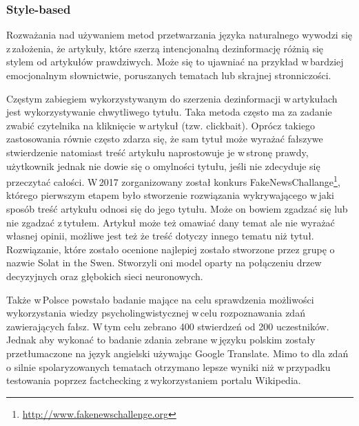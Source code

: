 \subsubsection{Style-based}
Rozważania nad używaniem metod przetwarzania języka naturalnego wywodzi się z\,założenia, że artykuły, które szerzą intencjonalną dezinformację różnią się stylem od artykułów prawdziwych. Może się to ujawniać na przykład w\,bardziej emocjonalnym słownictwie, poruszanych tematach lub skrajnej stronniczości.
\par Częstym zabiegiem wykorzystywanym do szerzenia dezinformacji w\,artykułach jest wykorzystywanie chwytliwego tytułu. Taka metoda często ma za zadanie zwabić czytelnika na kliknięcie w\,artykuł (tzw. clickbait). Oprócz takiego zastosowania równie często zdarza się, że sam tytuł może wyrażać fałszywe stwierdzenie natomiast treść artykułu naprostowuje je w\,stronę prawdy, użytkownik jednak nie dowie się o omylności tytułu, jeśli nie zdecyduje się przeczytać całości. W\,2017 zorganizowany został konkurs FakeNewsChallange\footnote{\url{http://www.fakenewschallenge.org}}, którego pierwszym etapem było stworzenie rozwiązania wykrywającego w\,jaki sposób treść artykułu odnosi się do jego tytułu. Może on bowiem zgadzać się lub nie zgadzać z\,tytułem. Artykuł może też omawiać dany temat ale nie wyrażać własnej opinii, możliwe jest też że treść dotyczy innego tematu niż tytuł. Rozwiązanie, które zostało ocenione najlepiej zostało stworzone przez grupę o nazwie Solat in the Swen. Stworzyli oni model oparty na połączeniu drzew decyzyjnych oraz głębokich sieci neuronowych. 
\par
Także w\,Polsce powstało badanie mające na celu sprawdzenia możliwości wykorzystania wiedzy psycholingwistycznej w\,celu rozpoznawania zdań zawierających fałsz\cite{wawer2019fact}. W\,tym celu zebrano 400 stwierdzeń od 200 uczestników. Jednak aby wykonać to badanie zdania zebrane w\,języku polskim zostały przetłumaczone na język angielski używając Google Translate. Mimo to dla zdań o silnie spolaryzowanych tematach otrzymano lepsze wyniki niż w\,przypadku testowania poprzez factchecking z\,wykorzystaniem portalu Wikipedia. 

